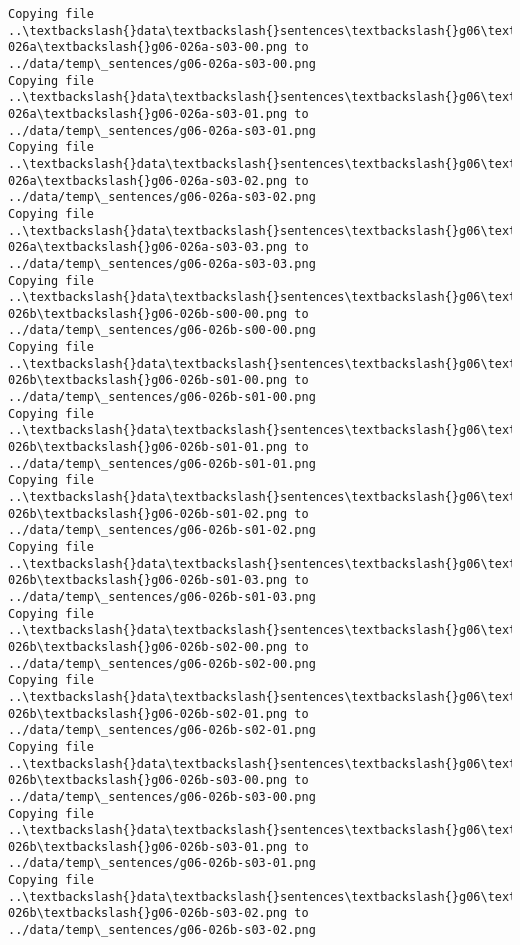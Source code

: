 \documentclass[11pt]{article}
\begin{document}
\begin{Verbatim}[commandchars=\\\{\}]
Copying file ..\textbackslash{}data\textbackslash{}sentences\textbackslash{}g06\textbackslash{}g06-026a\textbackslash{}g06-026a-s03-00.png to
../data/temp\_sentences/g06-026a-s03-00.png
Copying file ..\textbackslash{}data\textbackslash{}sentences\textbackslash{}g06\textbackslash{}g06-026a\textbackslash{}g06-026a-s03-01.png to
../data/temp\_sentences/g06-026a-s03-01.png
Copying file ..\textbackslash{}data\textbackslash{}sentences\textbackslash{}g06\textbackslash{}g06-026a\textbackslash{}g06-026a-s03-02.png to
../data/temp\_sentences/g06-026a-s03-02.png
Copying file ..\textbackslash{}data\textbackslash{}sentences\textbackslash{}g06\textbackslash{}g06-026a\textbackslash{}g06-026a-s03-03.png to
../data/temp\_sentences/g06-026a-s03-03.png
Copying file ..\textbackslash{}data\textbackslash{}sentences\textbackslash{}g06\textbackslash{}g06-026b\textbackslash{}g06-026b-s00-00.png to
../data/temp\_sentences/g06-026b-s00-00.png
Copying file ..\textbackslash{}data\textbackslash{}sentences\textbackslash{}g06\textbackslash{}g06-026b\textbackslash{}g06-026b-s01-00.png to
../data/temp\_sentences/g06-026b-s01-00.png
Copying file ..\textbackslash{}data\textbackslash{}sentences\textbackslash{}g06\textbackslash{}g06-026b\textbackslash{}g06-026b-s01-01.png to
../data/temp\_sentences/g06-026b-s01-01.png
Copying file ..\textbackslash{}data\textbackslash{}sentences\textbackslash{}g06\textbackslash{}g06-026b\textbackslash{}g06-026b-s01-02.png to
../data/temp\_sentences/g06-026b-s01-02.png
Copying file ..\textbackslash{}data\textbackslash{}sentences\textbackslash{}g06\textbackslash{}g06-026b\textbackslash{}g06-026b-s01-03.png to
../data/temp\_sentences/g06-026b-s01-03.png
Copying file ..\textbackslash{}data\textbackslash{}sentences\textbackslash{}g06\textbackslash{}g06-026b\textbackslash{}g06-026b-s02-00.png to
../data/temp\_sentences/g06-026b-s02-00.png
Copying file ..\textbackslash{}data\textbackslash{}sentences\textbackslash{}g06\textbackslash{}g06-026b\textbackslash{}g06-026b-s02-01.png to
../data/temp\_sentences/g06-026b-s02-01.png
Copying file ..\textbackslash{}data\textbackslash{}sentences\textbackslash{}g06\textbackslash{}g06-026b\textbackslash{}g06-026b-s03-00.png to
../data/temp\_sentences/g06-026b-s03-00.png
Copying file ..\textbackslash{}data\textbackslash{}sentences\textbackslash{}g06\textbackslash{}g06-026b\textbackslash{}g06-026b-s03-01.png to
../data/temp\_sentences/g06-026b-s03-01.png
Copying file ..\textbackslash{}data\textbackslash{}sentences\textbackslash{}g06\textbackslash{}g06-026b\textbackslash{}g06-026b-s03-02.png to
../data/temp\_sentences/g06-026b-s03-02.png

\end{Verbatim}
\end{document}
